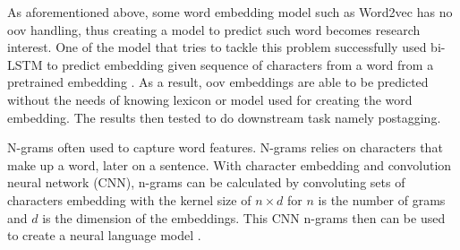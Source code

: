 As aforementioned above, some word embedding model such as Word2vec
has no oov handling, thus creating a model to predict such word
becomes research interest. One of the model that tries to tackle this
problem successfully used bi-LSTM to predict embedding given sequence
of characters from a word from a pretrained embedding
\citep{mimicking2017Pinter}. As a result, oov embeddings are able to
be predicted without the needs of knowing lexicon or model used for
creating the word embedding. The results then tested to do downstream
task namely postagging.

N-grams often used to capture word features. N-grams relies on
characters that make up a word, later on a sentence. With character
embedding and convolution neural network (CNN), n-grams can be calculated by
convoluting sets of characters embedding with the kernel size of $n
\times d$ for $n$ is the number of grams and $d$ is the dimension of
the embeddings. This CNN n-grams then can be used to create a neural
language model \citep{character2015kim}.